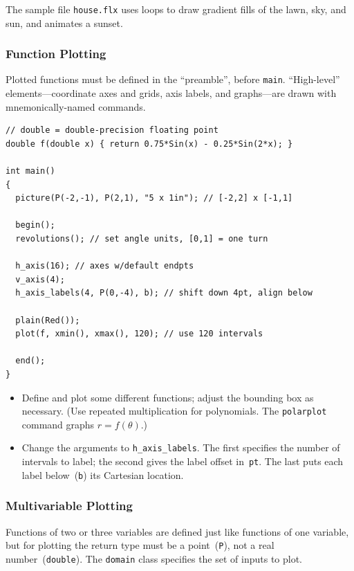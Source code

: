 \documentclass[12pt,letterpaper]{book}
\newcommand{\code}[1]{\texttt{#1}}
\newcommand{\filename}[1]{\texttt{#1}}
\newcommand{\teximath}[1]{$#1$}
\begin{document}
\noindent The sample file \filename{house.flx} uses loops to draw
gradient fills of the lawn, sky, and sun, and animates a sunset.


\subsubsection*{Function Plotting}

Plotted functions must be defined in the ``preamble'', before
\code{main}. ``High-level'' elements---coordinate axes and grids, axis
labels, and graphs---are drawn with mnemonically-named commands.
\begin{verbatim}
// double = double-precision floating point
double f(double x) { return 0.75*Sin(x) - 0.25*Sin(2*x); }

int main()
{
  picture(P(-2,-1), P(2,1), "5 x 1in"); // [-2,2] x [-1,1]

  begin();
  revolutions(); // set angle units, [0,1] = one turn

  h_axis(16); // axes w/default endpts
  v_axis(4);
  h_axis_labels(4, P(0,-4), b); // shift down 4pt, align below

  plain(Red());
  plot(f, xmin(), xmax(), 120); // use 120 intervals

  end();
}
\end{verbatim}

\begin{center}
  
\end{center}

\begin{itemize}

\item Define and plot some different functions; adjust the bounding
  box as necessary. (Use repeated multiplication for polynomials.
  The \code{polarplot} command graphs \teximath{r=f(\theta)}.)

\item Change the arguments to \code{h\_axis\_labels}. The first
  specifies the number of intervals to label; the second gives the
  label offset in~\code{pt}. The last puts each label below~(\code{b})
  its Cartesian location.

\end{itemize}


\subsubsection*{Multivariable Plotting}

Functions of two or three variables are defined just like functions of
one variable, but for plotting the return type must be a
point~(\code{P}), not a real number~(\code{double}). The \code{domain}
class specifies the set of inputs to plot.
\end{document}

